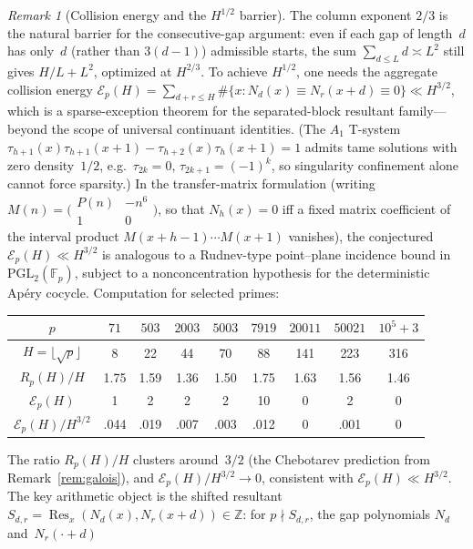 \documentclass[11pt]{article}
\theoremstyle{definition}
\theoremstyle{remark}
\newtheorem{remark}[theorem]{Remark}
\begin{document}
\begin{remark}[Collision energy and the $H^{1/2}$ barrier]%
\label{rem:collision}
The column exponent $2/3$ is the natural barrier for the
consecutive-gap argument: even if each gap of length~$d$ has
only~$d$ (rather than $3(d{-}1)$) admissible starts, the
sum $\sum_{d \le L} d \asymp L^2$ still gives $H/L + L^2$,
optimized at $H^{2/3}$. To achieve $H^{1/2}$, one needs
the aggregate collision energy
$\mathcal{E}_p(H)
= \sum_{d+r \le H}\#\{x : N_d(x) \equiv N_r(x{+}d) \equiv 0\}
\ll H^{3/2}$,
which is a sparse-exception theorem for the separated-block
resultant family---beyond the scope of universal continuant
identities.
(The $A_1$ T-system $\tau_{h+1}(x)\tau_{h+1}(x+1) -
\tau_{h+2}(x)\tau_h(x+1) = 1$ admits tame solutions
with zero density~$1/2$, e.g.~$\tau_{2k}=0$,
$\tau_{2k+1}=(-1)^k$, so singularity confinement
alone cannot force sparsity.)
In the transfer-matrix formulation (writing
$M(n) = \bigl(\begin{smallmatrix}P(n)&{-n^6}\\
1&0\end{smallmatrix}\bigr)$, so that $N_h(x) = 0$
iff a fixed matrix coefficient of the interval product
$M(x{+}h{-}1)\cdots M(x{+}1)$ vanishes), the conjectured
$\mathcal{E}_p(H) \ll H^{3/2}$ is analogous to a
Rudnev-type point--plane incidence bound in
$\mathrm{PGL}_2(\mathbb{F}_p)$, subject to a
nonconcentration hypothesis for the deterministic
Ap\'ery cocycle.
Computation for selected primes:
\begin{center}
\begin{tabular}{c|cccccccc}
$p$ & $71$ & $503$ & $2003$ & $5003$ & $7919$ & $20011$ & $50021$ & $10^5{+}3$ \\
\hline
$H = \lfloor\sqrt{p}\rfloor$ & 8 & 22 & 44 & 70 & 88 & 141 & 223 & 316 \\
$R_p(H)/H$ & 1.75 & 1.59 & 1.36 & 1.50 & 1.75 & 1.63 & 1.56 & 1.46 \\
$\mathcal{E}_p(H)$ & 1 & 2 & 2 & 2 & 10 & 0 & 2 & 0 \\
$\mathcal{E}_p(H)/H^{3/2}$ & .044 & .019 & .007 & .003 & .012 & 0 & .001 & 0
\end{tabular}
\end{center}
The ratio $R_p(H)/H$ clusters around~$3/2$
(the Chebotarev prediction from
Remark~\ref{rem:galois}), and
$\mathcal{E}_p(H)/H^{3/2} \to 0$, consistent with
$\mathcal{E}_p(H) \ll H^{3/2}$.
The key arithmetic object is the shifted resultant
$S_{d,r} = \operatorname{Res}_x(N_d(x), N_r(x+d)) \in \mathbb{Z}$:
for $p \nmid S_{d,r}$, the gap polynomials $N_d$ and~$N_r(\cdot + d)$

\end{remark}
\end{document}
